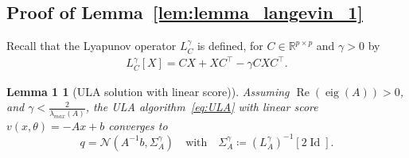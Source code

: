 \documentclass[11pt]{article}
\newcommand{\eqdef}{\coloneqq}
\newcommand{\id}{\operatorname{Id}}
\newcommand{\RR}{\mathbb{R}}
\begin{document}
\subsection{Proof of Lemma~\ref{lem:lemma_langevin_1}} \label{app:lemma_langevin_1}

Recall that the Lyapunov operator $L^\gamma_C$ is defined, for $C \in \RR^{p\times p}$ and $\gamma >0$ by 
\begin{align} \label{eq:inv_lyap}
    L^\gamma_C[X] = CX + XC^\top - \gamma C X C^\top .
\end{align}
\newtheorem*{repeatlem1}{Lemma 1}
\begin{repeatlem1}[ULA solution with linear score)] 
    Assuming $\operatorname{Re}(\operatorname{eig}(A)) > 0$, and ${\gamma < \frac{2}{\lambda_{max}(A)}}$, the ULA algorithm~\eqref{eq:ULA} with linear score $v(x, \theta) = -A x + b$ converges to 
     \begin{equation*}
    q = \mathcal{N}(A^{-1}b, \Sigma^\gamma_A) \quad \text{with} \quad  \Sigma^\gamma_A \eqdef (L^\gamma_A)^{-1}[2\id].
    \end{equation*}
\end{repeatlem1}
\end{document}
